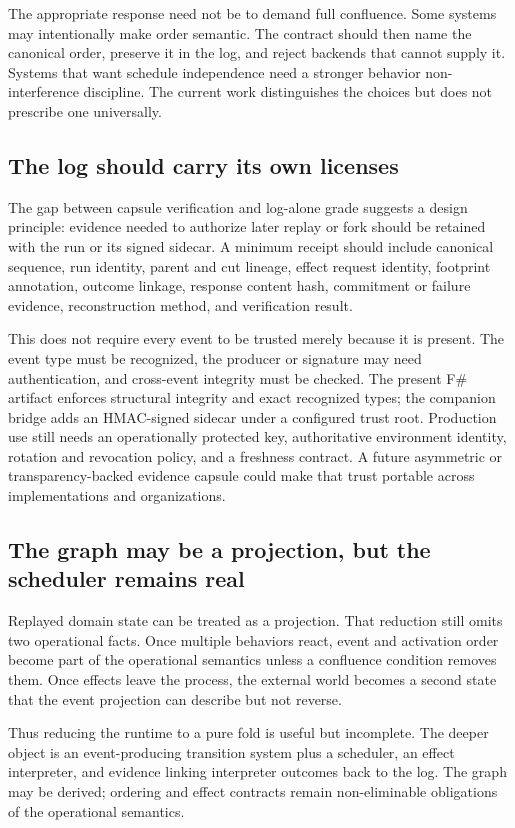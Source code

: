 The appropriate response need not be to demand full confluence.  Some systems
may intentionally make order semantic.  The contract should then name the
canonical order, preserve it in the log, and reject backends that cannot supply
it.  Systems that want schedule independence need a stronger behavior
non-interference discipline.  The current work distinguishes the choices but
does not prescribe one universally.

\subsection{The log should carry its own licenses}

The gap between capsule verification and log-alone grade suggests a design
principle: evidence needed to authorize later replay or fork should be retained
with the run or its signed sidecar.  A minimum receipt should include canonical
sequence, run identity, parent and cut lineage, effect request identity,
footprint annotation, outcome linkage, response content hash, commitment or
failure evidence, reconstruction method, and verification result.

This does not require every event to be trusted merely because it is present.
The event type must be recognized, the producer or signature may need
authentication, and cross-event integrity must be checked.  The present
F\# artifact enforces structural integrity and exact recognized types; the
companion bridge adds an HMAC-signed sidecar under a configured trust root.
Production use still needs an operationally protected key, authoritative
environment identity, rotation and revocation policy, and a freshness contract.
A future asymmetric or transparency-backed evidence capsule could make that
trust portable across implementations and organizations.

\subsection{The graph may be a projection, but the scheduler remains real}

Replayed domain state can be treated as a projection.  That reduction still
omits two operational facts.  Once multiple
behaviors react, event and activation order become part of the operational
semantics unless a confluence condition removes them.  Once effects leave the
process, the external world becomes a second state that the event projection
can describe but not reverse.

Thus reducing the runtime to a pure fold is useful but incomplete.  The deeper
object is an event-producing transition system plus a scheduler, an effect
interpreter, and evidence linking interpreter outcomes back to the log.  The
graph may be derived; ordering and effect contracts remain non-eliminable
obligations of the operational semantics.

